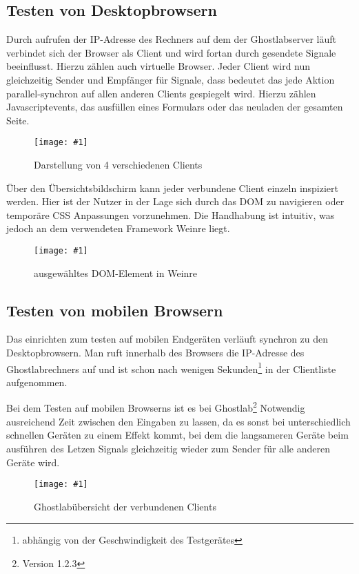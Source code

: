 \documentclass[13pt,a4paper,oneside]{scrbook} %
\newcommand{\mi}[1]{\index{#1}#1}
\renewcommand{\\}{\bigskip}
\newcommand{\ig}[3]{
\begin{figure}[htbp]
	\centering
	\texttt{[image: \#1]}%
	\caption[#2]{#3}%
\end{figure}
}
\begin{document}
		\subsection{Testen von Desktopbrowsern}
		Durch aufrufen der IP-Adresse des Rechners auf dem der Ghostlabserver läuft verbindet sich der Browser als Client und 			wird fortan durch gesendete Signale beeinflusst. Hierzu zählen auch virtuelle Browser. Jeder Client wird nun gleichzeitig 			Sender und Empfänger für Signale, dass bedeutet das jede Aktion parallel-synchron auf allen anderen Clients gespiegelt 			wird. Hierzu zählen Javascriptevents, das ausfüllen eines Formulars oder das neuladen der gesamten Seite.
		\ig{../pictures/ghostlab/workspaces}{Übersicht Clients}{Darstellung von 4 verschiedenen Clients } 
		
		Über den Übersichtsbildschirm kann jeder verbundene Client einzeln inspiziert werden. Hier ist der Nutzer in der Lage sich 		durch das DOM zu navigieren oder temporäre CSS Anpassungen vorzunehmen. Die Handhabung ist intuitiv, was jedoch an 		dem verwendeten Framework \mi{Weinre} liegt.
		\ig{../pictures/ghostlab/weinre}{Exemplarisch Weinreansicht}{ausgewähltes DOM-Element in Weinre}
		
		\pagebreak
		\subsection{Testen von mobilen Browsern}
		
		Das einrichten zum testen auf mobilen Endgeräten verläuft synchron zu den Desktopbrowsern. Man ruft innerhalb des 			Browsers die IP-Adresse des Ghostlabrechners auf und ist schon nach wenigen Sekunden\footnote{abhängig von der 			Geschwindigkeit des Testgerätes} in der Clientliste aufgenommen.
		
		\\Bei dem Testen auf mobilen Browserns ist es bei Ghostlab\footnote{Version 1.2.3} Notwendig ausreichend Zeit zwischen 		den Eingaben zu lassen, da es sonst bei unterschiedlich schnellen Geräten zu einem Effekt kommt, bei dem die 				langsameren Geräte beim ausführen des Letzen Signals gleichzeitig wieder zum Sender für alle anderen Geräte wird.
		\ig{../pictures/ghostlab/uebersicht_mobil}{Übersicht mobile Clients Ghostlab}{Ghostlabübersicht der verbundenen Clients}
		
		\pagebreak
		
\end{document}
